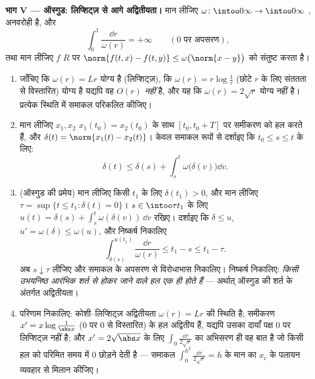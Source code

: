 \begin{problem}[{सप्ताहांत समस्या --- लिप्शिट्ज़ के बिना $x' = f(t, x)$ के
हलों का अस्तित्व}]
\medskip
\noindent\textbf{भाग V --- ऑस्गुड: लिप्शिट्ज़ से आगे
अद्वितीयता।} मान लीजिए $\omega\colon\intoo0\infty\to\intoo0\infty$ , अनवरोही है, और
\[
\int_0^1\frac{\dd r}{\omega(r)} = +\infty
\qquad(0 \text{ पर अपसरण}),
\]
तथा मान लीजिए $f$ $R$ पर $\norm{f(t, x) - f(t, y)} \leq
\omega\bigl(\norm{x - y}\bigr)$ को संतुष्ट करता है।
\begin{enumerate}[resume]
  \item जाँचिए कि $\omega(r) = Lr$ योग्य है (लिप्शिट्ज़), कि $\omega(r) = r\log\frac1r$
        (छोटे $r$ के लिए संततता से विस्तारित) योग्य है यद्यपि
        वह $O(r)$ \emph{नहीं} है, और यह कि $\omega(r) = 2\sqrt r$ योग्य नहीं है।
        प्रत्येक स्थिति में समाकल परिकलित कीजिए।
  \item मान लीजिए $x_1, x_2$ $x_1(t_0) = x_2(t_0)$ के साथ $[t_0, t_0 + T]$ पर समीकरण को हल करते
        हैं, और $\delta(t) =
        \norm{x_1(t) - x_2(t)}$। केवल समाकल रूपों से दर्शाइए कि $t_0 \leq s \leq t$ के
        लिए:
        \[
        \delta(t) \leq \delta(s) +
        \int_s^t\omega\bigl(\delta(v)\bigr)\dd v .
        \]
  \item (ऑस्गुड की प्रमेय) मान लीजिए किसी $t_1$ के लिए $\delta(t_1) > 0$, और
        मान लीजिए $\tau = \sup\{t \leq t_1 : \delta(t) =
        0\}$। $s \in \intoo\tau{t_1}$ के लिए $u(t) = \delta(s)
        + \int_s^t\omega(\delta(v))\,\dd v$ रखिए। दर्शाइए कि
        $\delta \leq
        u$, $u' = \omega(\delta) \leq \omega(u)$, और निष्कर्ष निकालिए
        \[
        \int_{\delta(s)}^{u(t_1)}\frac{\dd r}{\omega(r)}
        \leq t_1 - s \leq t_1 - \tau .
        \]
        अब $s \downarrow \tau$ लीजिए और समाकल के अपसरण से विरोधाभास निकालिए।
        निष्कर्ष निकालिए: \emph{किसी उभयनिष्ठ आरंभिक शर्त से
        होकर जाने वाले हल एक ही होते हैं} --- अर्थात् ऑस्गुड की
        शर्त के अंतर्गत अद्वितीयता।
  \item परिणाम निकालिए: कोशी--लिप्शिट्ज़ अद्वितीयता $\omega(r) = Lr$ की
        स्थिति है; समीकरण $x' =
        x\log\frac1{\abs x}$ ($0$ पर $0$ से विस्तारित) के
        हल अद्वितीय हैं, यद्यपि उसका दायाँ पक्ष $0$ पर
        लिप्शिट्ज़ नहीं है; और $x' = 2\sqrt{\abs x}$ के लिए $\int_0\frac{\dd r}{2\sqrt r}$ का अभिसरण ही
        वह बात है जो किसी हल को परिमित समय में $0$ छोड़ने देती
        है --- समाकल $\int_0^{h^2}\frac{\dd r}{2\sqrt r} = h$ के मान का $x_c$ के पलायन व्यवहार से
        मिलान कीजिए।
\end{enumerate}


\end{problem}
